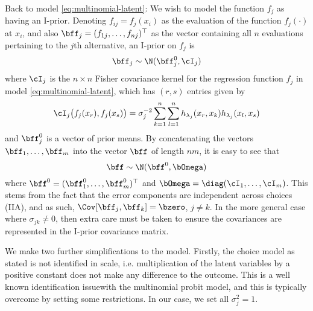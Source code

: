 \documentclass[]{article}
\begin{document}
Back to model \eqref{eq:multinomial-latent}: We wish to model the function $f_j$ as having an I-prior. Denoting $f_{ij} = f_j(x_i)$ as the evaluation of the function $f_j(\cdot)$ at $x_i$, and also $\bff_j = (f_{1j}, \dots, f_{nj})^\top$ as the vector containing all $n$ evaluations pertaining to the $j$th alternative, an I-prior on $f_j$ is 
\[
  \bff_j \sim \N(\bff_j^0, \cI_j)
\]
where $\cI_j$ is the $n \times n$ Fisher covariance kernel for the regression function $f_j$ in model \eqref{eq:multinomial-latent}, which has $(r,s)$ entries given by
\[
  \cI_j\big( f_j(x_r), f_j(x_s) \big) = \sigma_j^{-2} \sum_{k=1}^n \sum_{l=1}^n  h_{\lambda_j}(x_r, x_k) h_{\lambda_j}(x_l, x_s)
\]
and $\bff_j^0$ is a vector of prior means. By concatenating the vectors $\bff_1, \dots, \bff_m$ into the vector $\bff$ of length $nm$, it is easy to see that 
\[
  \bff \sim \N(\bff^0, \bOmega)
\]
where $\bff^0 = (\bff_1^0, \dots, \bff_m^0)^\top$ and $\bOmega = \diag(\cI_1, \dots, \cI_m)$. This stems from the fact that the error components are independent across choices (IIA), and as such, $\Cov[\bff_j, \bff_k] = \bzero$, $j \neq k$. In the more general case where $\sigma_{jk} \neq 0$, then extra care must be taken to ensure the covariances are represented in the I-prior covariance matrix.

We make two further simplifications to the model. Firstly, the choice model as stated is not identified in scale, i.e. multiplication of the latent variables by a positive constant does not make any difference to the outcome. This is a well known identification issue\footnotemark with the multinomial probit model, and this is typically overcome by setting some restrictions. In our case, we set all $\sigma_j^2 = 1$.

\end{document}
